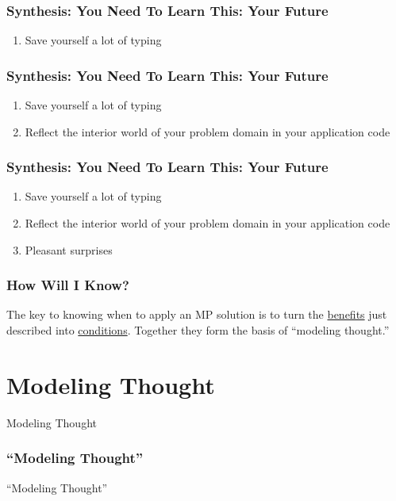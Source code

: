 \documentclass[slidestop,compress,mathserif]{beamer}
\begin{document}
\begin{frame}
	\frametitle{Synthesis:  You Need To Learn This:  Your Future}
	\begin{enumerate}
		\item Save yourself a lot of typing
	\end{enumerate}
\end{frame}

\begin{frame}
	\frametitle{Synthesis:  You Need To Learn This:  Your Future}
	\begin{enumerate}
		\item Save yourself a lot of typing
		\item Reflect the interior world of your problem domain in your application code
	\end{enumerate}
\end{frame}

\begin{frame}
	\frametitle{Synthesis:  You Need To Learn This:  Your Future}
	\begin{enumerate}
		\item Save yourself a lot of typing
		\item Reflect the interior world of your problem domain in your application code
		\item Pleasant surprises
	\end{enumerate}
\end{frame}

\begin{frame}
	\frametitle{How Will I Know?}
	The key to knowing when to apply an MP solution is to turn the
\underline{benefits} just described into \underline{conditions}. Together they
form the basis of ``modeling thought.''
\end{frame}

\section{Modeling Thought} %
\label{sec:modeling_thought}

\begin{frame}
	\begin{center}
		Modeling Thought
	\end{center}
\end{frame}

\begin{frame}
	\frametitle{``Modeling Thought''}
	\large
	\vskip 0.5cm
	\begin{center}
		``Modeling Thought''
	\end{center}
	
	\normalsize
\end{frame}
\end{document}
